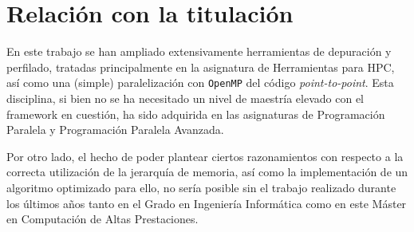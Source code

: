 \section{Relación con la titulación}
En este trabajo se han ampliado extensivamente herramientas de depuración y perfilado, tratadas principalmente en la asignatura de Herramientas para HPC, así como una (simple) paralelización con \texttt{OpenMP} del código \textit{point-to-point}. Esta disciplina, si bien no se ha necesitado un nivel de maestría elevado con el framework en cuestión, ha sido adquirida en las asignaturas de Programación Paralela y Programación Paralela Avanzada.

Por otro lado, el hecho de poder plantear ciertos razonamientos con respecto a la correcta utilización de la jerarquía de memoria, así como la implementación de un algoritmo optimizado para ello, no sería posible sin el trabajo realizado durante los últimos años tanto en el Grado en Ingeniería Informática como en este Máster en Computación de Altas Prestaciones.


